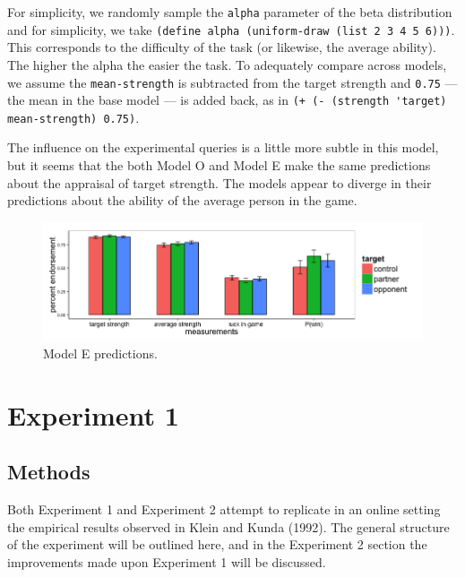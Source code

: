 \documentclass{article}
\begin{document}
For simplicity, we randomly sample the \lstinline{alpha} parameter of the beta distribution and for simplicity, we take
\lstinline{(define alpha (uniform-draw (list 2 3 4 5 6)))}. This corresponds to the difficulty of the task (or likewise, the average ability). The higher the alpha the easier the task. To adequately compare across models, we assume the \lstinline{mean-strength} is subtracted from the target strength and \lstinline{0.75} --- the mean in the base model --- is added back, as in \lstinline{(+ (- (strength 'target) mean-strength) 0.75)}.

The influence on the experimental queries is a little more subtle in this model, but it seems that the both Model O and Model E make the same predictions about the appraisal of target strength. The models appear to diverge in their predictions about the ability of the average person in the game.

\begin{figure}
\centering
    \includegraphics[width=\columnwidth]{modelE-predictions}
    \caption{Model E predictions.}
      \label{fig:modele}
\end{figure}


\section{Experiment 1}

\subsection{Methods}

Both Experiment 1 and Experiment 2 attempt to replicate in an online setting the empirical results observed in Klein and Kunda (1992). The general structure of the experiment will be outlined here, and in the Experiment 2 section the improvements made upon Experiment 1 will be discussed.
\end{document}
